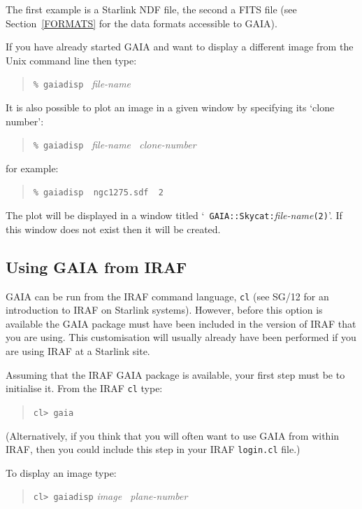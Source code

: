 \documentclass[twoside,11pt]{article}
\newcommand{\xref}[3]{#1}
\renewcommand{\_}{\texttt{\symbol{95}}}
\begin{document}
The first example is a Starlink NDF file, the second a FITS file (see
Section~\ref{FORMATS} for the data formats accessible to GAIA).

If you have already started GAIA and want to display a different image
from the Unix command line then type:

\begin{quote}
{\tt \%  gaiadisp} {\it ~file-name}
\end{quote}

It is also possible to plot an image in a given window by specifying its
`clone number':

\begin{quote}
{\tt \%  gaiadisp} {\it ~file-name ~clone-number}
\end{quote}

for example:

\begin{quote}
{\tt \%  gaiadisp ~ngc1275.sdf ~2}
\end{quote}

The plot will be displayed in a window titled `{\tt
GAIA::Skycat:}{\it file-name}\/{\tt (2)}'.  If this window does not exist
then it will be created.

\subsection{Using GAIA from IRAF}

GAIA can be run from the IRAF command language, {\tt cl} (see
\xref{SG/12}{sg12}{}\cite{SG12} for an introduction to IRAF on Starlink
systems).  However, before this option is available the GAIA package must
have been included in the version of IRAF that you are using.  This
customisation will usually already have been performed if you are using
IRAF at a Starlink site.

Assuming that the IRAF GAIA package is available, your first step must
be to initialise it.  From the IRAF {\tt cl} type:

\begin{quote}
{\tt cl>  gaia}
\end{quote}

(Alternatively, if you think that you will often want to use GAIA from
within IRAF, then you could include this step in your IRAF {\tt login.cl}
file.)

To display an image type:

\begin{quote}
{\tt cl>  gaiadisp} {\it image ~plane-number}
\end{quote}
\end{document}
